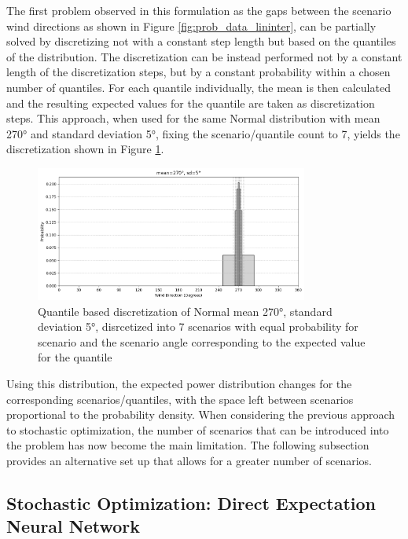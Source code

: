 The first problem observed in this formulation as the gaps between the scenario wind directions as shown in Figure \ref{fig:prob_data_lininter}, can be partially solved by discretizing not with a constant step length but based on the quantiles of the distribution. The discretization can be instead performed not by a constant length of the discretization steps, but by a constant probability within a chosen number of quantiles. For each quantile individually, the mean is then calculated and the resulting expected values for the quantile are taken as discretization steps. This approach, when used for the same Normal distribution with mean 270° and standard deviation 5°, fixing the scenario/quantile count to 7, yields the discretization shown in Figure \ref{fig:wind_dist_opti_quantiles}. 

\begin{figure}[h] 
	\centering
	\includegraphics[width=0.8\textwidth]{../figures/optimization/wind_dist_opti_quantiles.png} 
	\caption{Quantile based discretization of Normal mean 270°,  standard deviation 5°, disrcetized into 7 scenarios with equal probability for scenario and the scenario angle corresponding to the expected value for the quantile }
	\label{fig:wind_dist_opti_quantiles}
\end{figure} 

Using this distribution, the expected power distribution changes for the corresponding scenarios/quantiles, with the space left between scenarios proportional to the probability density. When considering the previous approach to stochastic optimization, the number of scenarios that can be introduced into the problem has now become the main limitation. The following subsection provides an alternative set up that allows for a greater number of scenarios.

\subsection{Stochastic Optimization: Direct Expectation Neural Network}

